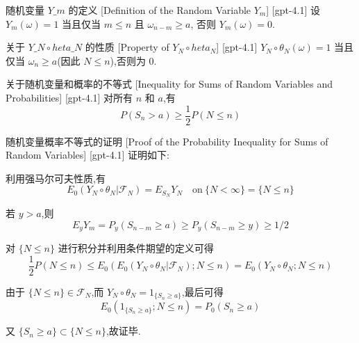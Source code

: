 \documentclass[UTF8]{ctexart}
\begin{document}
    
    
    \begin{dfn}
        {随机变量 $Y\_m$ 的定义}
        [Definition of the Random Variable $Y_m$]
        [gpt-4.1]
        设 $Y _ { m } ( \omega ) = 1$ 当且仅当 $m \leq n$ 且 $\omega _ { n - m } \geq a$, 否则 $Y _ { m } ( \omega ) = 0$.
    \end{dfn}
    
    
    
    \begin{ppt}
        {关于 $Y\_N \circ 	heta\_N$ 的性质}
        [Property of $Y_N \circ 	heta_N$]
        [gpt-4.1]
        $Y _ { N } \circ \theta _ { N } ( \omega ) = 1$ 当且仅当 $\omega _ { n } \geq a$(因此 $N \leq n$),否则为 $0$.
    \end{ppt}
    
    
    
    \begin{thm}
        {关于随机变量和概率的不等式}
        [Inequality for Sums of Random Variables and Probabilities]
        [gpt-4.1]
        对所有 $n$ 和 $a$,有
\[
P ( S _ { n } > a ) \geq \frac { 1 } { 2 } P ( N \leq n )
\]

    \end{thm}
    
    
    
    \begin{prf}
        {随机变量概率不等式的证明}
        [Proof of the Probability Inequality for Sums of Random Variables]
        [gpt-4.1]
        证明如下:

利用强马尔可夫性质,有
\[
E _ { 0 } ( Y _ { N } \circ \theta _ { N } | \mathcal { F } _ { N } ) = E _ { S _ { N } } Y _ { N } \quad \mathrm{on} \ \{ N < \infty \} = \{ N \leq n \}
\]

若 $y > a$,则
\[
E _ { y } Y _ { m } = P _ { y } ( S _ { n - m } \geq a ) \geq P _ { y } ( S _ { n - m } \geq y ) \geq 1 / 2
\]

对 $\{ N \leq n \}$ 进行积分并利用条件期望的定义可得
\[
\frac { 1 } { 2 } P ( N \leq n ) \leq E _ { 0 } ( E _ { 0 } ( Y _ { N } \circ \theta _ { N } | \mathcal{F} _ { N } ) ; N \leq n ) = E _ { 0 } ( Y _ { N } \circ \theta _ { N } ; N \leq n )
\]

由于 $\{ N \leq n \} \in \mathcal { F } _ { N }$,而 $Y _ { N } \circ \theta _ { N } = 1 _ { \{ S _ { n } \geq a \} }$,最后可得
\[
E _ { 0 } ( 1 _ { \{ S _ { n } \geq a \} } ; N \leq n ) = P _ { 0 } ( S _ { n } \geq a )
\]

又 $\{ S _ { n } \geq a \} \subset \{ N \leq n \}$,故证毕.
    \end{prf}
    
\end{document}
